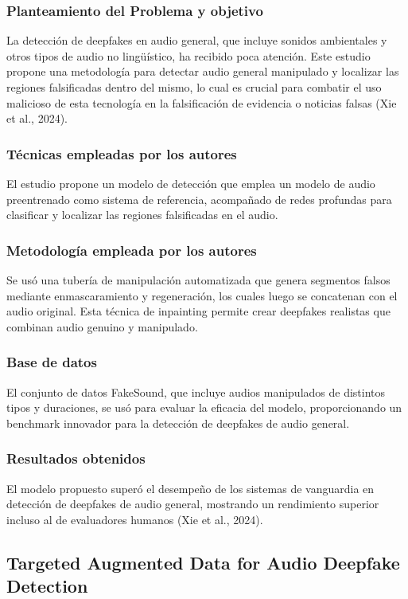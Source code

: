 \subsubsection{Planteamiento del Problema y objetivo }
La detección de deepfakes en audio general, que incluye sonidos ambientales y otros tipos de audio no lingüístico, ha recibido poca atención. Este estudio propone una metodología para detectar audio general manipulado y localizar las regiones falsificadas dentro del mismo, lo cual es crucial para combatir el uso malicioso de esta tecnología en la falsificación de evidencia o noticias falsas (Xie et al., 2024).

\subsubsection{Técnicas empleadas por los autores}
El estudio propone un modelo de detección que emplea un modelo de audio preentrenado como sistema de referencia, acompañado de redes profundas para clasificar y localizar las regiones falsificadas en el audio.

\subsubsection{Metodología empleada por los autores}
Se usó una tubería de manipulación automatizada que genera segmentos falsos mediante enmascaramiento y regeneración, los cuales luego se concatenan con el audio original. Esta técnica de inpainting permite crear deepfakes realistas que combinan audio genuino y manipulado.

\subsubsection{Base de datos}
El conjunto de datos FakeSound, que incluye audios manipulados de distintos tipos y duraciones, se usó para evaluar la eficacia del modelo, proporcionando un benchmark innovador para la detección de deepfakes de audio general.

\subsubsection{Resultados obtenidos}
El modelo propuesto superó el desempeño de los sistemas de vanguardia en detección de deepfakes de audio general, mostrando un rendimiento superior incluso al de evaluadores humanos (Xie et al., 2024).

\subsection{Targeted Augmented Data for Audio Deepfake Detection \citep*{pr_dehghani2018copper}}

